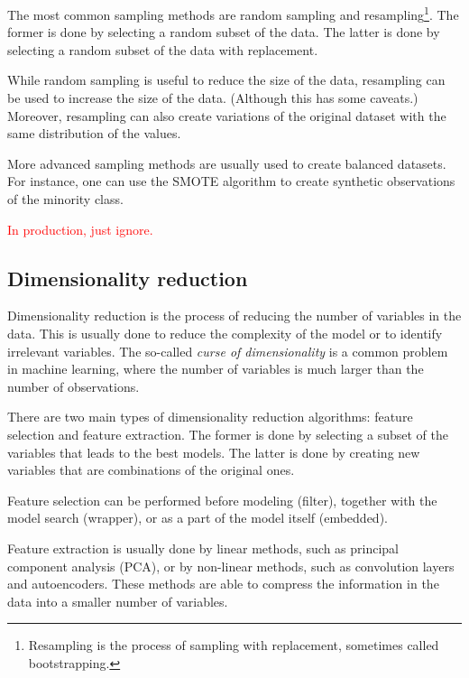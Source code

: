 The most common sampling methods are random sampling and resampling\footnote{Resampling is
the process of sampling with replacement, sometimes called bootstrapping.}.  The former is
done by selecting a random subset of the data.  The latter is done by selecting a random
subset of the data with replacement.

While random sampling is useful to reduce the size of the data, resampling can be used to
increase the size of the data.  (Although this has some caveats.)  Moreover, resampling
can also create variations of the original dataset with the same distribution of the
values.

More advanced sampling methods are usually used to create balanced datasets.  For
instance, one can use the SMOTE algorithm to create
synthetic observations of the minority class.

\textcolor{red}{In production, just ignore.}

\subsection{Dimensionality reduction}

Dimensionality reduction is the process of reducing the number of variables in the data.
This is usually done to reduce the complexity of the model or to identify irrelevant
variables.  The so-called \emph{curse of dimensionality} is a common problem in machine
learning, where the number of variables is much larger than the number of observations.

There are two main types of dimensionality reduction algorithms: feature selection and
feature extraction.  The former is done by selecting a subset of the variables that leads
to the best models.  The latter is done by creating new variables that are combinations
of the original ones.

Feature selection can be performed before modeling (filter), together with the model
search (wrapper), or as a part of the model itself (embedded).

Feature extraction is usually done by linear methods, such as principal component analysis
(PCA), or by non-linear methods, such as convolution layers and autoencoders.  These methods are able to
compress the information in the data into a smaller number of variables.


